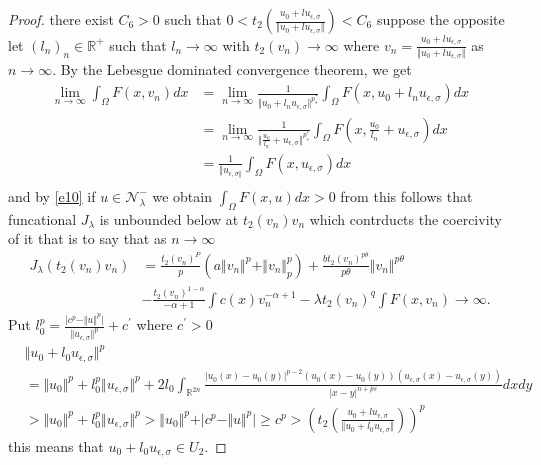 \documentclass[10pt,twoside,reqno,centertags,draft]{amsart}
\begin{document}
\begin{proof}
there exist $ C_6 >0$ such that $ 0 <t_2(\frac{u_0 +lu_{\epsilon,\sigma}}{\Vert u_0 +lu_{\epsilon,\sigma}\Vert}) < C_6$ suppose the opposite let $ (l_n)_n \in \mathbb{R}^+$ such that $ l_n \to \infty$ with $ t_2(v_n) \longrightarrow \infty$ where $ v_n =\frac{u_0 +lu_{\epsilon,\sigma}}{\Vert u_0 +lu_{\epsilon,\sigma}\Vert}$ as $ n \to \infty.$ By the Lebesgue dominated convergence theorem, we get 
\begin{equation*}
\begin{aligned}
\lim_{n \to \infty}\int_{\Omega}F(x,v_n)dx &=\lim_{n \to \infty}\frac{1}{\Vert u_0 +l_nu_{\epsilon,\sigma}\Vert^{p_s^*}}\int_{\Omega}F(x,u_0 +l_nu_{\epsilon,\sigma})dx\\
& =\lim_{n \to \infty}\frac{1}{\Vert \frac{u_0}{l_n}  +u_{\epsilon,\sigma}\Vert^{p_s^*}}\int_{\Omega}F(x,\frac{u_0}{l_n} +u_{\epsilon,\sigma})dx\\
& =\frac{1}{\Vert u_{\epsilon, \sigma\Vert}}\int_{\Omega}F(x, u_{\epsilon,\sigma})dx\\
\end{aligned}
\end{equation*}
and by \ref{e10} if $ u \in \mathcal{N}_{\lambda}^{-}$ we obtain $ \int_{\Omega} F(x,u)dx >0$ from this follows that funcational $ J_{\lambda}$ is unbounded below at $ t_2(v_n)v_n$ which contrducts the coercivity of it that is to say that as  $ n \to \infty$
\begin{equation*}
\begin{aligned}
J_{\lambda}(t_2(v_n)v_n) &=  \frac{t_2(v_n)^P}{p} \left(a \Vert v_n \Vert^p + \Vert v_n \Vert^{p}_{p}\right) + \frac{b t_2(v_n)^{p \theta}}{p \theta}\Vert v_n \Vert^{p \theta}\\ 
&-\frac{t_2(v_n)^{1-\alpha}}{-\alpha+1} \int c(x)v_n^{-\alpha+1} - \lambda t_2(v_n)^q \int F(x,v_n) \longrightarrow \infty.
\end{aligned}
\end{equation*}
Put $ l_0^{p} =\frac{\vert c^p -\Vert u\Vert^{p} \vert}{\Vert u_{\epsilon,\sigma}\Vert^{p}} +c^{\prime} $ where $ c^{\prime} >0$
{\tiny
\begin{equation*}
\begin{aligned}
&\Vert u_0 +l_0u_{\epsilon,\sigma}\Vert^{p}\\
&=\Vert u_0\Vert^{p} +l_0^{p}\Vert u_{\epsilon,\sigma}\Vert^{p} +2l_0\int_{\mathbb{R}^{2n}}\frac{\vert u_0(x) -u_0(y)\vert^{p -2}(u_0(x) -u_0(y))(u_{\epsilon,\sigma}(x) -u_{\epsilon,\sigma}(y))}{\vert x -y\vert^{n +ps}}dxdy\\
&>\Vert u_0\Vert^{p} +l_0^{p}\Vert u_{\epsilon,\sigma}\Vert^{p} > \Vert u_0\Vert^{p} +\vert c^p -\Vert u\Vert^{p}\vert \geq c^{p} >\left( t_2(\frac{u_0 +lu_{\epsilon,\sigma}}{\Vert u_0 +l_0u_{\epsilon,\sigma}\Vert})\right)^{p}
\end{aligned}
\end{equation*}
}
this means that $  u_0 +l_0u_{\epsilon,\sigma} \in U_2.$
\end{proof}
\end{document}
